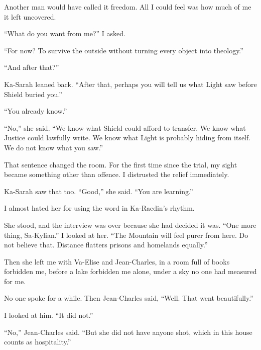 Another man would have called it freedom. All I could feel was how much of me it left uncovered.\par

``What do you want from me?'' I asked.\par

``For now? To survive the outside without turning every object into theology.''\par

``And after that?''\par

Ka-Sarah leaned back. ``After that, perhaps you will tell us what Light saw before Shield buried you.''\par

``You already know.''\par

``No,'' she said. ``We know what Shield could afford to transfer. We know what Justice could lawfully write. We know what Light is probably hiding from itself. We do not know what you saw.''\par

That sentence changed the room. For the first time since the trial, my sight became something other than offence. I distrusted the relief immediately.\par

Ka-Sarah saw that too. ``Good,'' she said. ``You are learning.''\par

I almost hated her for using the word in Ka-Raedin's rhythm.\par

She stood, and the interview was over because she had decided it was. ``One more thing, Sa-Kylian.'' I looked at her. ``The Mountain will feel purer from here. Do not believe that. Distance flatters prisons and homelands equally.''\par

Then she left me with Va-Elise and Jean-Charles, in a room full of books forbidden me, before a lake forbidden me alone, under a sky no one had measured for me.\par

No one spoke for a while. Then Jean-Charles said, ``Well. That went beautifully.''\par

I looked at him. ``It did not.''\par

``No,'' Jean-Charles said. ``But she did not have anyone shot, which in this house counts as hospitality.''\par

